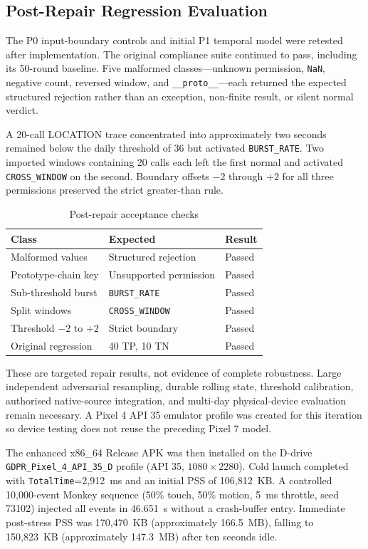 
\subsection{Post-Repair Regression Evaluation}
The P0 input-boundary controls and initial P1 temporal model were retested after implementation. The original compliance suite continued to pass, including its 50-round baseline. Five malformed classes---unknown permission, \texttt{NaN}, negative count, reversed window, and \texttt{\_\_proto\_\_}---each returned the expected structured rejection rather than an exception, non-finite result, or silent normal verdict.

A 20-call LOCATION trace concentrated into approximately two seconds remained below the daily threshold of 36 but activated \texttt{BURST\_RATE}. Two imported windows containing 20 calls each left the first normal and activated \texttt{CROSS\_WINDOW} on the second. Boundary offsets $-2$ through $+2$ for all three permissions preserved the strict greater-than rule.

\begin{table}[H]
\centering
\caption{Post-repair acceptance checks}
\label{tab:post-repair-checks}
\begin{tabular}{lll}
\toprule
\textbf{Class} & \textbf{Expected} & \textbf{Result} \\
\midrule
Malformed values & Structured rejection & Passed \\
Prototype-chain key & Unsupported permission & Passed \\
Sub-threshold burst & \texttt{BURST\_RATE} & Passed \\
Split windows & \texttt{CROSS\_WINDOW} & Passed \\
Threshold $-2$ to $+2$ & Strict boundary & Passed \\
Original regression & 40 TP, 10 TN & Passed \\
\bottomrule
\end{tabular}
\end{table}

These are targeted repair results, not evidence of complete robustness. Large independent adversarial resampling, durable rolling state, threshold calibration, authorised native-source integration, and multi-day physical-device evaluation remain necessary. A Pixel 4 API 35 emulator profile was created for this iteration so device testing does not reuse the preceding Pixel 7 model.

The enhanced x86\_64 Release APK was then installed on the D-drive \texttt{GDPR\_Pixel\_4\_API\_35\_D} profile (API 35, $1080 \times 2280$). Cold launch completed with \texttt{TotalTime}=2,912~ms and an initial PSS of 106,812~KB. A controlled 10,000-event Monkey sequence (50\% touch, 50\% motion, 5~ms throttle, seed 73102) injected all events in 46.651~s without a crash-buffer entry. Immediate post-stress PSS was 170,470~KB (approximately 166.5~MB), falling to 150,823~KB (approximately 147.3~MB) after ten seconds idle.

